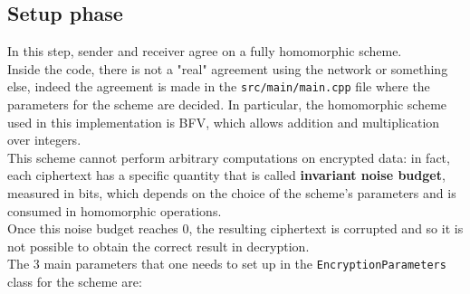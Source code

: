 \documentclass[10pt]{extarticle}
\begin{document}
\subsection{Setup phase}
In this step, sender and receiver agree on a fully homomorphic scheme.\\
Inside the code, there is not a "real" agreement using the network or something else, indeed the agreement is made in the \texttt{src/main/main.cpp} file where the parameters for the scheme are decided. In particular, the homomorphic scheme used in this implementation is BFV, which allows addition and multiplication over integers.\\This scheme cannot perform arbitrary computations on encrypted data: in fact, each ciphertext has a specific quantity that is called \textbf{invariant noise budget}, measured in bits, which depends on the choice of the scheme's parameters and is consumed in homomorphic operations.\\Once this noise budget reaches 0, the resulting ciphertext is corrupted and so it is not possible to obtain the correct result in decryption.\\The 3 main parameters that one needs to set up in the \texttt{EncryptionParameters} class for the scheme are:
\end{document}
